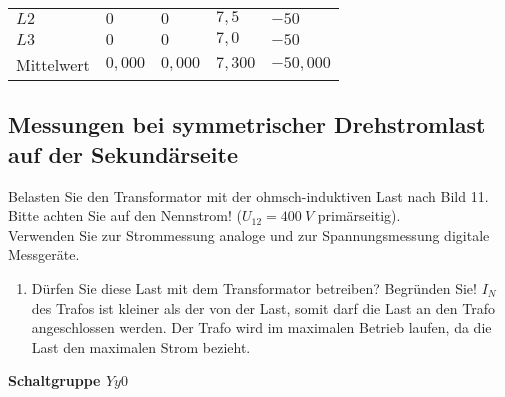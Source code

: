 \begin{enumerate}[label=\alph*)]
\begin{table}[h!]
\begin{tabular}{lllll}
            $L2$       & $0$                      & $0$                         & $7,5$                    & $-50$                       \\
            $L3$       & $0$                      & $0$                         & $7,0$                    & $-50$                       \\ \hline
            Mittelwert & $0,000$                  & $0,000$                     & $7,300$                  & $-50,000$                   \\ \hline\hline
          \end{tabular}
        \end{table}
\end{enumerate}

\subsection{Messungen bei symmetrischer Drehstromlast auf der Sekundärseite }
Belasten Sie den Transformator mit der ohmsch-induktiven Last nach Bild 11.\\
Bitte achten Sie auf den Nennstrom! ($U_{12} = 400\ V$ primärseitig). \\
Verwenden Sie zur Strommessung analoge und zur Spannungsmessung digitale
Messgeräte.
\begin{enumerate}[label=\alph*)]
  \item Dürfen Sie diese Last mit dem Transformator betreiben? Begründen Sie! $I_N$ des
        Trafos ist kleiner als der von der Last, somit darf die Last an den Trafo
        angeschlossen werden. Der Trafo wird im maximalen Betrieb laufen, da die Last
        den maximalen Strom bezieht.
\end{enumerate}
\textbf{Schaltgruppe $Yy0$}
